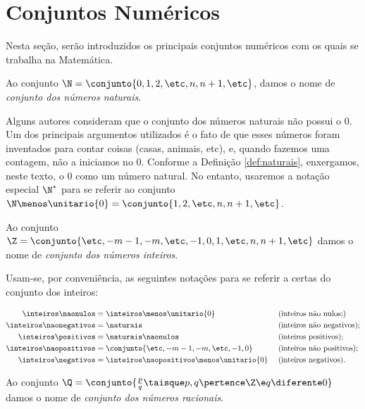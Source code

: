 \section{Conjuntos Numéricos}

Nesta seção, serão introduzidos os principais conjuntos numéricos com os quais se trabalha na Matemática.

\begin{definition}
	\label{def:naturais}
	Ao conjunto $\N = \conjunto{0, 1, 2, \etc , n, n+1, \etc}$, damos o nome de \emph{conjunto dos números naturais}.
\end{definition}

Alguns autores consideram que o conjunto dos números naturais não possui o 0.
Um dos principais argumentos utilizados é o fato de que esses números foram inventados para contar coisas (casas, animais, etc), e, quando fazemos uma contagem, não a iniciamos no 0.
Conforme a Definição \ref{def:naturais}, enxergamos, neste texto, o 0 como um número natural. No entanto, usaremos a notação especial $\N^*$ para se referir ao conjunto $\N \menos \unitario{0} = \conjunto{1, 2, \etc, n, n+1, \etc}$.


\begin{definition}
	Ao conjunto $\Z = \conjunto{\etc , -m -1, -m, \etc, -1, 0, 1,  \etc , n, n+1, \etc}$ damos o nome de \emph{conjunto dos números inteiros}. 
\end{definition}

Usam-se, por conveniência, as seguintes notações para se referir a certas  do conjunto dos inteiros:

\begin{align*}
	\inteiros\naonulos     &= \inteiros \menos \unitario{0}              &&\text{ (inteiros não nulos;)}     \\
	\inteiros\naonegativos &= \naturais                                  &&\text{ (inteiros não negativos);} \\
	\inteiros\positivos    &= \naturais\naonulos                         &&\text{ (inteiros positivos);}     \\
	\inteiros\naopositivos &= \conjunto{\etc, -{m-1}, -m, \etc, -1, 0}   &&\text{ (inteiros não positivos);} \\
	\inteiros\negativos    &= \inteiros\naopositivos \menos \unitario{0} &&\text{ (inteiros negativos).}     
\end{align*}

\begin{definition}
	Ao conjunto $\Q = \conjunto{\frac p q \taisque p, q \pertence \Z \e q \diferente 0}$ damos o nome de \emph{conjunto dos números racionais}.
\end{definition}

